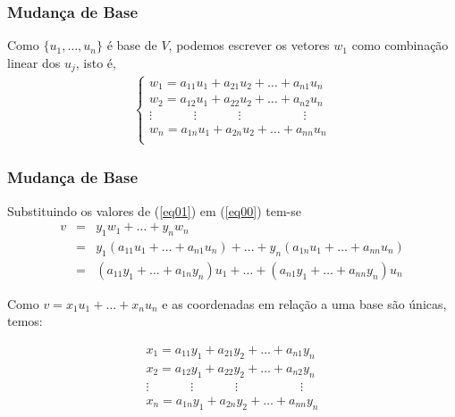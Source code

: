 \documentclass[hyperref={pdfpagelabels=false}]{beamer}
\begin{document}
\begin{frame}
	\frametitle{Mudança de Base}
	
	Como $\{ u_1, \dots, u_n\}$ é base de $V$, podemos escrever os vetores $w_1$ como combinação linear dos $u_j$, isto é,
	\begin{eqnarray}
	\label{eq01}
	\begin{cases}
	w_1 = a_{11}u_1 + a_{21}u_2 + \dots + a_{n1}u_n \\
	w_2 = a_{12}u_1 + a_{22}u_2 + \dots + a_{n2}u_n \\
	\vdots \hspace{40pt} \vdots \hspace{40pt} \vdots \hspace{60pt} \vdots \\
	w_n = a_{1n}u_1 + a_{2n}u_2 + \dots + a_{nn}u_n \\
	\end{cases}
	\end{eqnarray}
	
\end{frame}

\begin{frame}
	\frametitle{Mudança de Base}
	
	Substituindo os valores de (\ref{eq01}) em (\ref{eq00}) tem-se
	\begin{eqnarray*}
		v & = & y_1 w_1 + \dots + y_n w_n \\
		& = & y_1 (a_{11}u_1 + \dots + a_{n1}u_n) + \dots + y_n (a_{1n}u_1 + \dots + a_{nn}u_n) \\
		& = & (a_{11}y_1 + \dots + a_{1n}y_n)u_1 + \dots + (a_{n1}y_1 + \dots + a_{nn}y_n)u_n
	\end{eqnarray*}

	Como $v = x_1 u_1 + \dots + x_n u_n$ e as coordenadas em relação a uma base são únicas, temos:
	
	\begin{eqnarray*}
		x_1 = a_{11}y_1 + a_{21}y_2 + \dots + a_{n1}y_n \\
		x_2 = a_{12}y_1 + a_{22}y_2 + \dots + a_{n2}y_n \\
		\vdots \hspace{40pt} \vdots \hspace{40pt} \vdots \hspace{60pt} \vdots \\
		x_n = a_{1n}y_1 + a_{2n}y_2 + \dots + a_{nn}y_n \\
	\end{eqnarray*}
	
\end{frame}
\end{document}
